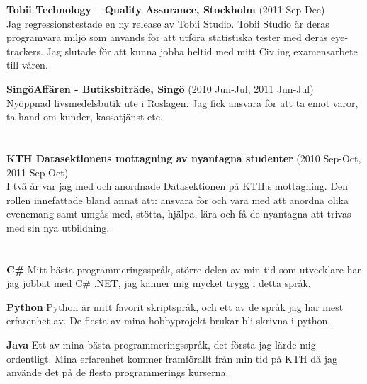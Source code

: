 \documentclass[margin,line]{resume}%
\begin{document}
\begin{resume}
		\textbf{Tobii Technology – Quality Assurance, Stockholm} (2011 Sep-Dec)\\
		Jag regressionstestade en ny release av Tobii Studio. Tobii Studio är deras
		programvara miljö som används för att utföra statistiska tester med deras
		eye-trackers. Jag slutade för att kunna jobba heltid med mitt Civ.ing
		examensarbete till våren.

		\textbf{SingöAffären - Butiksbiträde, Singö} (2010 Jun-Jul, 2011 Jun-Jul)\\
		Nyöppnad livsmedelsbutik ute i Roslagen. Jag fick ansvara för att ta emot varor, ta
		hand om kunder, kassatjänst etc.

	\section{}\vspace{0.001mm}

		\textbf{KTH Datasektionens mottagning av nyantagna studenter} (2010
		Sep-Oct, 2011 Sep-Oct)\\
		I två år var jag med och anordnade Datasektionen på KTH:s mottagning. Den
		rollen innefattade bland annat att: ansvara för och vara med att anordna
		olika evenemang samt umgås med, stötta, hjälpa, lära och få de nyantagna att trivas
		med sin nya utbildning.

	   \section{}\vspace{0.001mm}

		\textbf{C\#}\hspace{0.5cm}
		Mitt bästa programmeringsspråk, större delen av min tid som utvecklare
		har jag jobbat med C\# .NET, jag känner mig mycket trygg i detta språk.

		\textbf{Python}\hspace{0.5cm}
		Python är mitt favorit skriptspråk, och ett av de språk jag har mest
		erfarenhet av. De flesta av mina hobbyprojekt brukar bli skrivna i python.

		\textbf{Java}\hspace{0.5cm}
		Ett av mina bästa programmeringsspråk, det första jag lärde mig
		ordentligt. Mina erfarenhet kommer framförallt från min tid på KTH då
		jag använde det på de flesta programmerings kurserna.


\end{resume}
\end{document}
